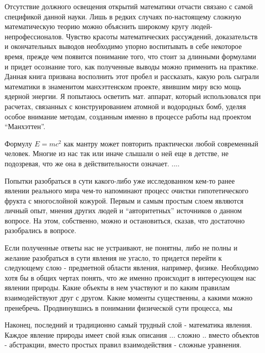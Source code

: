 Отсутствие должного освещения открытий математики отчасти связано с самой спецификой данной науки. Лишь в редких случаях по-настоящему сложную математическую теорию можно объяснить широкому кругу людей-непрофессионалов. Чувство красоты математических рассуждений, доказательств и окончательных выводов необходимо упорно воспитывать в себе некоторое время, прежде чем появится понимание того, что стоит за длинными формулами и придет осознание того, как полученные выводы можно применить на практике.
Данная книга призвана восполнить этот пробел и рассказать, какую роль сыграли математики в знаменитом манхэттенском проекте, явившим миру всю мощь ядерной энергии. Я попытаюсь осветить мат. аппарат, который использовался при расчетах, связанных с конструированием атомной и водородных бомб, уделяя особое внимание методам, созданным именно в процессе работы над проектом “Манхэттен”.



Формулу $E = mc^2$ как мантру может повторить практически любой современный человек.
Многие из нас так или иначе слышали о ней еще в детстве, не подозревая, что же она в действительности означает.
....


Попытки разобраться в сути какого-либо уже исследованном кем-то ранее явлении реального мира чем-то напоминают процесс очистки гипотетического фрукта с многослойной кожурой.
Первым и самым простым слоем являются личный опыт, мнения других людей и ``авторитетных'' источников о данном вопросе. 
На этом, собственно, можно и остановиться, сказав, что достаточно разобрались в вопросе.

Если полученные ответы нас не устраивают, не понятны, либо не полны и желание разобраться в сути явления не угасло, то придется перейти к следующему слою - предметной области явления, например, физике.
Необходимо хотя бы в общих чертах понять, что же именно происходит в интересующем нас явлении природы. 
Какие объекты в нем участвуют и по каким правилам взаимодействуют друг с другом. Какие моменты существенны, а какими можно пренебречь.
Продвинувшись в понимании физической сути процесса, мы 

Наконец, последний и традиционно самый трудный слой - математика явления.
Каждое явление природы имеет свой язык описания  ...  сложно .. вместо объектов - абстракции, вместо простых правил взаимодействия - сложные уравнения.


